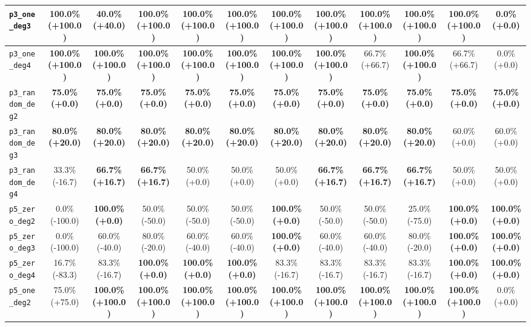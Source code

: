 \begin{landscape}
\begin{table}[H]
{\begin{tabular}{lccccccccccc}
\hline
\texttt{p3\_one\_deg3} & \textbf{100.0\% (+100.0)} & 40.0\% (+40.0) & \textbf{100.0\% (+100.0)} & \textbf{100.0\% (+100.0)} & \textbf{100.0\% (+100.0)} & \textbf{100.0\% (+100.0)} & \textbf{100.0\% (+100.0)} & \textbf{100.0\% (+100.0)} & \textbf{100.0\% (+100.0)} & \textbf{100.0\% (+100.0)} & 0.0\% (+0.0) \\
\hline
\texttt{p3\_one\_deg4} & \textbf{100.0\% (+100.0)} & \textbf{100.0\% (+100.0)} & \textbf{100.0\% (+100.0)} & \textbf{100.0\% (+100.0)} & \textbf{100.0\% (+100.0)} & \textbf{100.0\% (+100.0)} & \textbf{100.0\% (+100.0)} & 66.7\% (+66.7) & \textbf{100.0\% (+100.0)} & 66.7\% (+66.7) & 0.0\% (+0.0) \\
\hline
\texttt{p3\_random\_deg2} & \textbf{75.0\% (+0.0)} & \textbf{75.0\% (+0.0)} & \textbf{75.0\% (+0.0)} & \textbf{75.0\% (+0.0)} & \textbf{75.0\% (+0.0)} & \textbf{75.0\% (+0.0)} & \textbf{75.0\% (+0.0)} & \textbf{75.0\% (+0.0)} & \textbf{75.0\% (+0.0)} & \textbf{75.0\% (+0.0)} & \textbf{75.0\% (+0.0)} \\
\hline
\texttt{p3\_random\_deg3} & \textbf{80.0\% (+20.0)} & \textbf{80.0\% (+20.0)} & \textbf{80.0\% (+20.0)} & \textbf{80.0\% (+20.0)} & \textbf{80.0\% (+20.0)} & \textbf{80.0\% (+20.0)} & \textbf{80.0\% (+20.0)} & \textbf{80.0\% (+20.0)} & \textbf{80.0\% (+20.0)} & 60.0\% (+0.0) & 60.0\% (+0.0) \\
\hline
\texttt{p3\_random\_deg4} & 33.3\% (-16.7) & \textbf{66.7\% (+16.7)} & \textbf{66.7\% (+16.7)} & 50.0\% (+0.0) & 50.0\% (+0.0) & 50.0\% (+0.0) & \textbf{66.7\% (+16.7)} & \textbf{66.7\% (+16.7)} & \textbf{66.7\% (+16.7)} & 50.0\% (+0.0) & 50.0\% (+0.0) \\
\hline
\texttt{p5\_zero\_deg2} & 0.0\% (-100.0) & \textbf{100.0\% (+0.0)} & 50.0\% (-50.0) & 50.0\% (-50.0) & 50.0\% (-50.0) & \textbf{100.0\% (+0.0)} & 50.0\% (-50.0) & 50.0\% (-50.0) & 25.0\% (-75.0) & \textbf{100.0\% (+0.0)} & \textbf{100.0\% (+0.0)} \\
\hline
\texttt{p5\_zero\_deg3} & 0.0\% (-100.0) & 60.0\% (-40.0) & 80.0\% (-20.0) & 60.0\% (-40.0) & 60.0\% (-40.0) & \textbf{100.0\% (+0.0)} & 60.0\% (-40.0) & 60.0\% (-40.0) & 80.0\% (-20.0) & \textbf{100.0\% (+0.0)} & \textbf{100.0\% (+0.0)} \\
\hline
\texttt{p5\_zero\_deg4} & 16.7\% (-83.3) & 83.3\% (-16.7) & \textbf{100.0\% (+0.0)} & \textbf{100.0\% (+0.0)} & \textbf{100.0\% (+0.0)} & 83.3\% (-16.7) & 83.3\% (-16.7) & 83.3\% (-16.7) & 83.3\% (-16.7) & \textbf{100.0\% (+0.0)} & \textbf{100.0\% (+0.0)} \\
\hline
\texttt{p5\_one\_deg2} & 75.0\% (+75.0) & \textbf{100.0\% (+100.0)} & \textbf{100.0\% (+100.0)} & \textbf{100.0\% (+100.0)} & \textbf{100.0\% (+100.0)} & \textbf{100.0\% (+100.0)} & \textbf{100.0\% (+100.0)} & \textbf{100.0\% (+100.0)} & \textbf{100.0\% (+100.0)} & \textbf{100.0\% (+100.0)} & 0.0\% (+0.0) \\

\end{tabular}}
\end{table}
\end{landscape}
